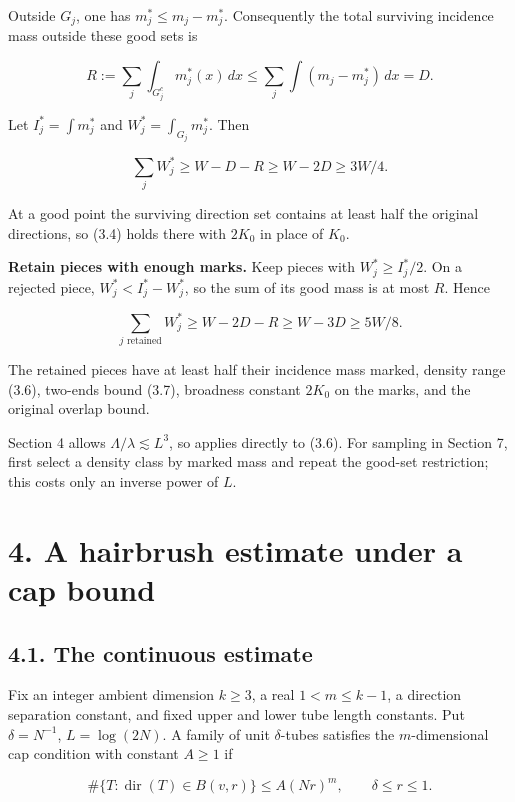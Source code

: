 \documentclass[
  11pt,
  a4paper,
]{article}
\begin{document}
Outside \(G_j\), one has \(m_j^*\le m_j-m_j^*\). Consequently the total
surviving incidence mass outside these good sets is

\[R:=\sum_j\int_{G_j^c}m_j^*(x)\,dx
 \le\sum_j\int(m_j-m_j^*)\,dx=D.
\tag{3.8}\label{eq:3.8}\]

Let \(I_j^*=\int m_j^*\) and \(W_j^*=\int_{G_j}m_j^*\). Then

\[\sum_j W_j^*\ge W-D-R\ge W-2D\ge3W/4.
\tag{3.9}\label{eq:3.9}\]

At a good point the surviving direction set contains at least half the
original directions, so (3.4) holds there with \(2K_0\) in place of
\(K_0\).

\textbf{Retain pieces with enough marks.} Keep pieces with
\(W_j^*\ge I_j^*/2\). On a rejected piece, \(W_j^*<I_j^*-W_j^*\), so the
sum of its good mass is at most \(R\). Hence

\[\sum_{j\text{ retained}}W_j^*
 \ge W-2D-R\ge W-3D\ge5W/8.
\tag{3.10}\label{eq:3.10}\]

The retained pieces have at least half their incidence mass marked,
density range (3.6), two-ends bound (3.7), broadness constant \(2K_0\)
on the marks, and the original overlap bound.

Section 4 allows \(\Lambda/\lambda\lesssim L^3\), so applies directly to
(3.6). For sampling in Section 7, first select a density class by marked
mass and repeat the good-set restriction; this costs only an inverse
power of \(L\).

\hypertarget{a-hairbrush-estimate-under-a-cap-bound}{%
\section{4. A hairbrush estimate under a cap
bound}\label{a-hairbrush-estimate-under-a-cap-bound}}

\hypertarget{the-continuous-estimate}{%
\subsection{4.1. The continuous
estimate}\label{the-continuous-estimate}}

Fix an integer ambient dimension \(k\ge3\), a real \(1<m\le k-1\), a
direction separation constant, and fixed upper and lower tube length
constants. Put \(\delta=N^{-1}\), \(L=\log(2N)\). A family of unit
\(\delta\)-tubes satisfies the \(m\)-dimensional cap condition with
constant \(A\ge1\) if

\[\#\{T:\operatorname{dir}(T)\in B(v,r)\}\le A(Nr)^m,
 \qquad \delta\le r\le1.
\tag{4.1}\label{eq:4.1}\]
\end{document}
